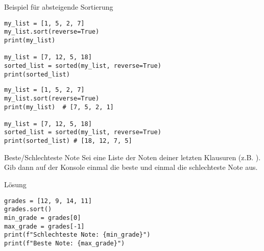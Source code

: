 \begin{fragile}
\begin{exampleblock}{Beispiel für absteigende Sortierung}
\vspace{2pt}
\begin{overprint}
\begin{verbatim}
my_list = [1, 5, 2, 7]
my_list.sort(reverse=True)
print(my_list)  

my_list = [7, 12, 5, 18]
sorted_list = sorted(my_list, reverse=True)
print(sorted_list) 
\end{verbatim}
\begin{verbatim}
my_list = [1, 5, 2, 7]
my_list.sort(reverse=True)
print(my_list)  # [7, 5, 2, 1]

my_list = [7, 12, 5, 18]
sorted_list = sorted(my_list, reverse=True)
print(sorted_list) # [18, 12, 7, 5] 
\end{verbatim}
\end{overprint}
\end{exampleblock}
\end{fragile}


\begin{fragile}[Übung]
	
\begin{block}{Beste/Schlechteste Note}
\vspace{2pt}
Sei  eine Liste der Noten deiner letzten Klausuren (z.B. ). 
Gib dann auf der Konsole einmal die beste und einmal die schlechteste Note aus. 
\end{block}	

\vspace{12pt}

\begin{solutionblock}{Lösung}
\begin{verbatim}
grades = [12, 9, 14, 11]
grades.sort()
min_grade = grades[0]
max_grade = grades[-1]
print(f"Schlechteste Note: {min_grade}")
print(f"Beste Note: {max_grade}")
\end{verbatim}
\end{solutionblock}
\end{fragile}

